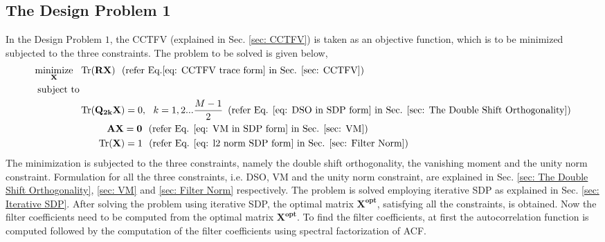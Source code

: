 \subsection{The Design Problem 1}
\label{sub: The Design Problem 1}
In the Design Problem $1$, the CCTFV (explained in Sec. \ref{sec: CCTFV}) is taken as an objective function, which is to be minimized subjected to the three constraints. The problem to be solved is given below,
\begin{eqnarray}
\begin{aligned}
\underset{\mathbf{X}} {\text{minimize}}\,\,\,\, & \operatorname{Tr}(\mathbf{RX})\,\,\,\,  (\text{refer Eq.\ref{eq: CCTFV trace form} in Sec. \ref{sec: CCTFV}})
\\ \text{subject to} &\\
& \operatorname{Tr}(\mathbf{Q_{2k}X}) = {0}, \,\,\,\, k=1,2...\frac{M-1}{2} \,\,\,(\text{refer Eq. \ref{eq: DSO in SDP form} in Sec. \ref{sec: The Double Shift Orthogonality}})
\\&\,\,\,\,\,\,\,\,\,\,\,\,\,\,\,\,\, \mathbf{AX} = \mathbf{0} \,\,\,\, (\text{refer Eq. \ref{eq: VM in SDP form} in Sec. \ref{sec: VM}}) 
\\&\,\,\,\,\,\,\,\,\,\,\, \operatorname{Tr}(\mathbf{X}) = {1} \,\,\,\, (\text{refer Eq. \ref{eq: l2 norm SDP form} in Sec. \ref{sec: Filter Norm}})
\end{aligned}
\end{eqnarray}
The minimization is subjected to the three constraints, namely the double shift orthogonality, the vanishing moment and the unity norm constraint. Formulation for all the three constraints, i.e. DSO, VM and the unity norm constraint, are explained in Sec. \ref{sec: The Double Shift Orthogonality}, \ref{sec: VM} and \ref{sec: Filter Norm} respectively. The problem is solved employing iterative SDP as explained in Sec. \ref{sec: Iterative SDP}. After solving the problem using iterative SDP, the optimal matrix $\mathbf{X^{opt}}$, satisfying all the constraints, is obtained. Now the filter coefficients need to be computed from the optimal matrix $\mathbf{X^{opt}}$. To find the filter coefficients, at first the autocorrelation function is computed followed by the computation of the filter coefficients using spectral factorization of ACF.

